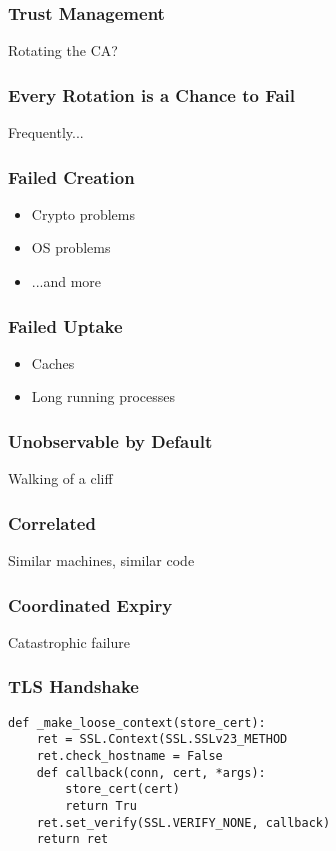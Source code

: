 \begin{frame}
\frametitle{Trust Management}

Rotating the CA?

\end{frame}

\begin{frame}
\frametitle{Every Rotation is a Chance to Fail}

Frequently...

\end{frame}


\begin{frame}
\frametitle{Failed Creation}
\begin{itemize}
\item Crypto problems
\item OS problems
\item ...and more
\end{itemize}
\end{frame}

\begin{frame}
\frametitle{Failed Uptake}
\begin{itemize}
\item Caches
\item Long running processes
\end{itemize}
\end{frame}


\begin{frame}
\frametitle{Unobservable by Default}
Walking of a cliff
\end{frame}

\begin{frame}
\frametitle{Correlated}
Similar machines, similar code
\end{frame}

\begin{frame}
\frametitle{Coordinated Expiry}

Catastrophic failure
\end{frame}

\begin{frame}[fragile]
\frametitle{TLS Handshake}

\begin{lstlisting}
def _make_loose_context(store_cert):
    ret = SSL.Context(SSL.SSLv23_METHOD
    ret.check_hostname = False
    def callback(conn, cert, *args):
        store_cert(cert)
        return Tru
    ret.set_verify(SSL.VERIFY_NONE, callback)
    return ret
\end{lstlisting}
\end{frame}

